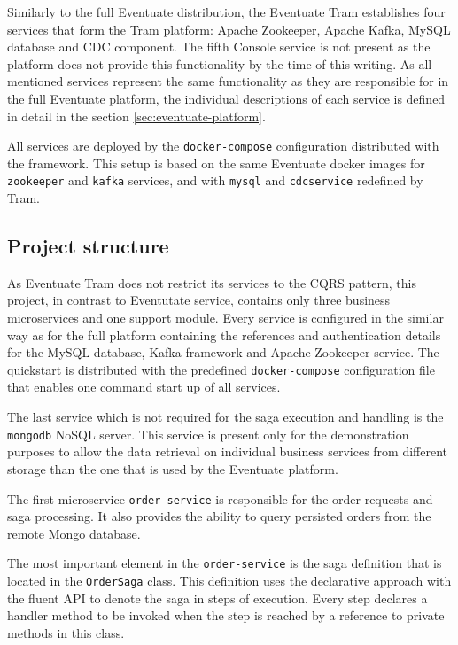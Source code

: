 \documentclass[oneside,
  digital, %
  table,   %
  nolof,     %
  nolot,     %
]{fithesis3}
\begin{document}
Similarly to the full Eventuate distribution, the Eventuate Tram establishes four services that form the Tram platform: Apache Zookeeper, Apache Kafka, MySQL database and CDC component. The fifth Console service is not present as the platform does not provide this functionality by the time of this writing. As all mentioned services represent the same functionality as they are responsible for in the full Eventuate platform, the individual descriptions of each service is defined in detail in the section \ref{sec:eventuate-platform}.  

All services are deployed by the \texttt{docker-compose} configuration distributed with the framework. This setup is based on the same Eventuate docker images for \texttt{zookeeper} and \texttt{kafka} services, and with \texttt{mysql} and \texttt{cdcservice} redefined by Tram.

\subsection{Project structure}

As Eventuate Tram does not restrict its services to the CQRS pattern, this project, in contrast to Eventutate service, contains only three business microservices and one support module. Every service is configured in the similar way as for the full platform containing the references and authentication details for the MySQL database, Kafka framework and Apache Zookeeper service. The quickstart is distributed with the predefined \texttt{docker-compose} configuration file that enables one command start up of all services.

The last service which is not required for the saga execution and handling is the \texttt{mongodb} NoSQL server. This service is present only for the demonstration purposes to allow the data retrieval on individual business services from different storage than the one that is used by the Eventuate platform.

The first microservice \texttt{order-service} is responsible for the order requests and saga processing. It also provides the ability to query persisted orders from the remote Mongo database.

The most important element in the \texttt{order-service} is the saga definition that is located in the \texttt{OrderSaga} class. This definition uses the declarative approach with the fluent API to denote the saga in steps of execution. Every step declares a handler method to be invoked when the step is reached by a reference to private methods in this class.
\end{document}
